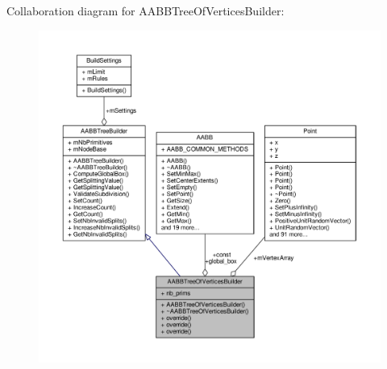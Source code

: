 Collaboration diagram for A\+A\+B\+B\+Tree\+Of\+Vertices\+Builder\+:
\nopagebreak
\begin{figure}[H]
\begin{center}
\leavevmode
\includegraphics[width=350pt]{d9/d38/classAABBTreeOfVerticesBuilder__coll__graph}
\end{center}
\end{figure}
